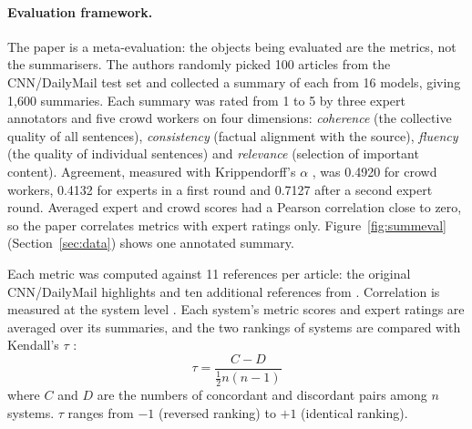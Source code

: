 \documentclass[11pt]{article}
\begin{document}
\paragraph{Evaluation framework.}
The paper is a meta-evaluation: the objects being evaluated are the metrics, not the summarisers. The authors randomly picked 100 articles from the CNN/DailyMail test set and collected a summary of each from 16 models, giving 1,600 summaries. Each summary was rated from 1 to 5 by three expert annotators and five crowd workers on four dimensions: \emph{coherence} (the collective quality of all sentences), \emph{consistency} (factual alignment with the source), \emph{fluency} (the quality of individual sentences) and \emph{relevance} (selection of important content). Agreement, measured with Krippendorff's $\alpha$ \citep{krippendorff-2011-computing}, was 0.4920 for crowd workers, 0.4132 for experts in a first round and 0.7127 after a second expert round. Averaged expert and crowd scores had a Pearson correlation close to zero, so the paper correlates metrics with expert ratings only. Figure~\ref{fig:summeval} (Section~\ref{sec:data}) shows one annotated summary.

Each metric was computed against 11 references per article: the original CNN/DailyMail highlights and ten additional references from \citet{kryscinski-etal-2020-evaluating}. Correlation is measured at the system level \citep{louis-nenkova-2013-automatically}. Each system's metric scores and expert ratings are averaged over its summaries, and the two rankings of systems are compared with Kendall's $\tau$ \citep{kendall-1938-new}:
\begin{equation}
\tau = \frac{C - D}{\tfrac{1}{2}n(n-1)}
\label{eq:tau}
\end{equation}
where $C$ and $D$ are the numbers of concordant and discordant pairs among $n$ systems. $\tau$ ranges from $-1$ (reversed ranking) to $+1$ (identical ranking).
\end{document}
